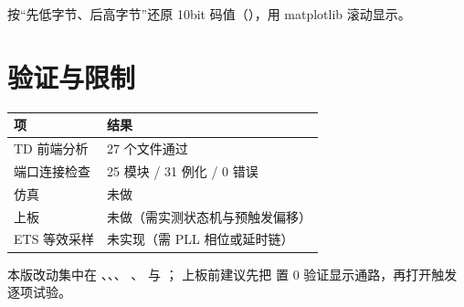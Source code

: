 按“先低字节、后高字节”还原 10bit 码值（），用 matplotlib 滚动显示。

\section{验证与限制}

\begin{center}
\small
\begin{tabular}{ll}
\toprule
项 & 结果\\
\midrule
TD 前端分析 & 27 个文件通过\\
端口连接检查 & 25 模块 / 31 例化 / 0 错误\\
仿真 & 未做\\
上板 & 未做（需实测状态机与预触发偏移）\\
ETS 等效采样 & 未实现（需 PLL 相位或延时链）\\
\bottomrule
\end{tabular}
\end{center}

\begin{warnbox}
本版改动集中在 、、、
、 与 ；
上板前建议先把  置 0 验证显示通路，再打开触发逐项试验。
\end{warnbox}
